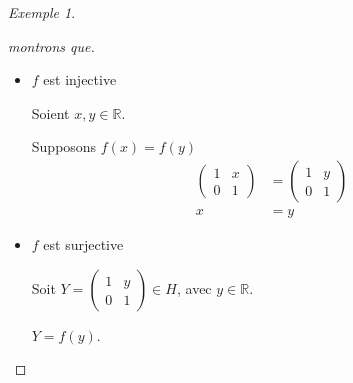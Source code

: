 \documentclass{report}
\newcommand*{\reels}{\mathbb{R}}
\theoremstyle{definition}
\theoremstyle{remark}
\newtheorem*{exem}{Exemple}
\begin{document}
\begin{exem}
\begin{enumerate}[label=(\arabic*)]
\begin{proof}[montrons que]
				\begin{itemize}
					\item $f$ est injective

					Soient $x,y \in \reels$.

					Supposons $f(x)=f(y)$
					\begin{align*}
						\begin{pmatrix}
							1&x\\0&1
						\end{pmatrix}&= \begin{pmatrix}
							1&y\\0&1
						\end{pmatrix}\\
						x&= y
					\end{align*}
					\item $f$ est surjective

					Soit $Y = \begin{pmatrix}
						1&y\\0&1
					\end{pmatrix} \in H$, avec $y \in \reels$.

					$Y = f(y)$.
				\end{itemize}
			\end{proof}
		\end{enumerate}
	\end{exem}
\end{document}
